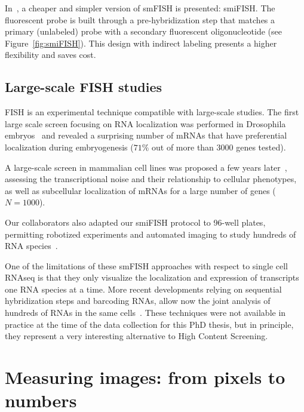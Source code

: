 In~\cite{tsanov_smifish_2016}, a cheaper and simpler version of \ac{smFISH} is presented: \ac{smiFISH}.
The fluorescent probe is built through a pre-hybridization step that matches a primary (unlabeled) probe with a secondary fluorescent oligonucleotide (see Figure~\ref{fig:smiFISH}).
This design with indirect labeling presents a higher flexibility and saves cost.

\subsection{Large-scale FISH studies}
\label{subsec:intro_scale_fish}

FISH is an experimental technique compatible with large-scale studies.
The first large scale screen focusing on RNA localization was performed in Drosophila embryos~\cite{lecuyer_global_2007} and revealed a surprising number of \ac{mRNA}s that have preferential localization during embryogenesis ($71\%$ out of more than 3000 genes tested). 

A large-scale screen in mammalian cell lines was proposed a few years later~\cite{battich_image-based_2013, battich_control_2015}, assessing the transcriptional noise and their relationship to cellular phenotypes, as well as subcellular localization of \ac{mRNA}s for a large number of genes ($N = 1000$).

Our collaborators also adapted our \ac{smiFISH} protocol to 96-well plates, permitting robotized experiments and automated imaging to study hundreds of \ac{RNA} species~\cite{tsanov_smifish_2016, safieddine_choreography_2021}.

One of the limitations of these \ac{smFISH} approaches with respect to single cell RNAseq is that they only visualize the localization and expression of transcripts one \ac{RNA} species at a time.
More recent developments relying on sequential hybridization steps and barcoding \ac{RNA}s, allow now the joint analysis of hundreds of \ac{RNA}s in the same cells~\cite{lubeck_single_cell_2014, Chen_2015, eng_seqfish_2019, fazalAtlasSubcellularRNA2019}.
These techniques were not available in practice at the time of the data collection for this PhD thesis, but in principle, they represent a very interesting alternative to High Content Screening.

\section{Measuring images: from pixels to numbers}
\label{sec:computation_biology}

